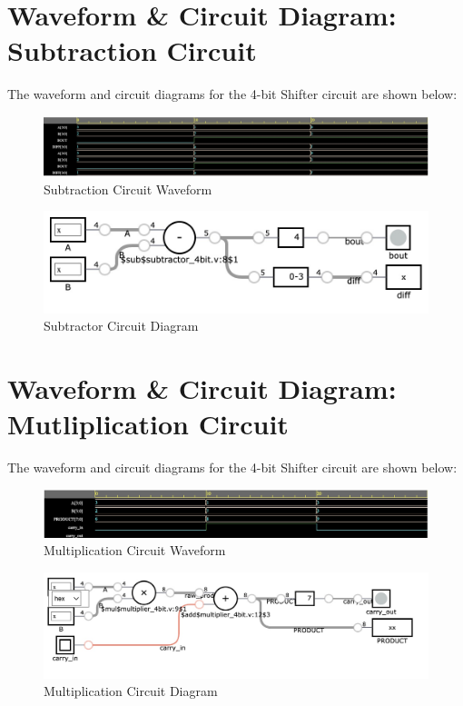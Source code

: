\documentclass[runningheads, 12pt]{report}
\begin{document}
\section{Waveform \& Circuit Diagram: Subtraction Circuit}	

The waveform and circuit diagrams for the 4-bit Shifter circuit are shown below:

\begin{figure}[h]
	\centering
	\includegraphics[scale=0.2]{subtractor_waveform}
	\caption{Subtraction Circuit Waveform}
	\label{fig: subtractor_waveform}
\end{figure}

\begin{figure}[h]
	\centering
	\includegraphics[width=1.0\textwidth]{subtractor_4bit}
	\caption{Subtractor Circuit Diagram}
	\label{fig: subtractor_4bit}
\end{figure}
\pagebreak

\section{Waveform \& Circuit Diagram: Mutliplication Circuit}	

The waveform and circuit diagrams for the 4-bit Shifter circuit are shown below:

\begin{figure}[h]
	\centering
	\includegraphics[scale=0.25]{multiplier_waveform}
	\caption{Multiplication Circuit Waveform}
	\label{fig: multiplier_waveform}
\end{figure}

\begin{figure}[h]
	\centering
	\includegraphics[width=1.0\textwidth]{multiplier_4bit}
	\caption{Multiplication Circuit Diagram}
	\label{fig: multiplier_4bit}
\end{figure}
\pagebreak
\end{document}
